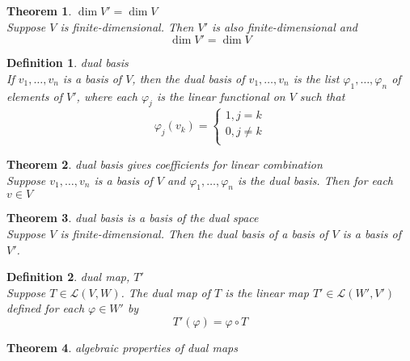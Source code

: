 \documentclass{article}
\newtheorem{theorem}{Theorem}[subsection]
\newtheorem{definition}{Definition}[subsection]
\begin{document}
\begin{CJK}{UTF8}{gkai}
\begin{theorem}
    $\dim V' = \dim V$\\

    Suppose $V$ is finite-dimensional. Then $V'$ is also finite-dimensional and
    \[\dim V' = \dim V\]
\end{theorem}

\begin{definition}
    dual basis\\

    If $v_1, \ldots,v_n$ is a basis of $V$, then the dual basis of $v_1,\ldots,v_n$ is the list $\varphi_1,\ldots,\varphi_n$ of elements of $V'$, where each $\varphi_j$ is the linear functional on $V$ such that
    \[\varphi_j(v_k) = 
    \begin{cases}
        1, j = k\\
        0, j \neq k\\
    \end{cases}\]

\end{definition}

\begin{theorem}
    dual basis gives coefficients for linear combination\\

    Suppose $v_1,\ldots,v_n$ is a basis of $V$ and $\varphi_1,\ldots,\varphi_n$ is the dual basis. Then for each $v \in V$\\
\end{theorem}

\begin{theorem}
    dual basis is a basis of the dual space\\

    Suppose $V$ is finite-dimensional. Then the dual basis of a basis of $V$ is a basis of $V'$.\\
\end{theorem}

\begin{definition}
    dual map, $T'$\\

    Suppose $T \in \mathcal{L}(V,W)$. The dual map of $T$ is the linear map $T' \in \mathcal{L}(W',V')$ defined for each $\varphi \in W'$ by
    \[T'(\varphi) = \varphi\circ T\]
\end{definition}

\begin{theorem}
    algebraic properties of dual maps\\


\end{theorem}
\end{CJK}
\end{document}
